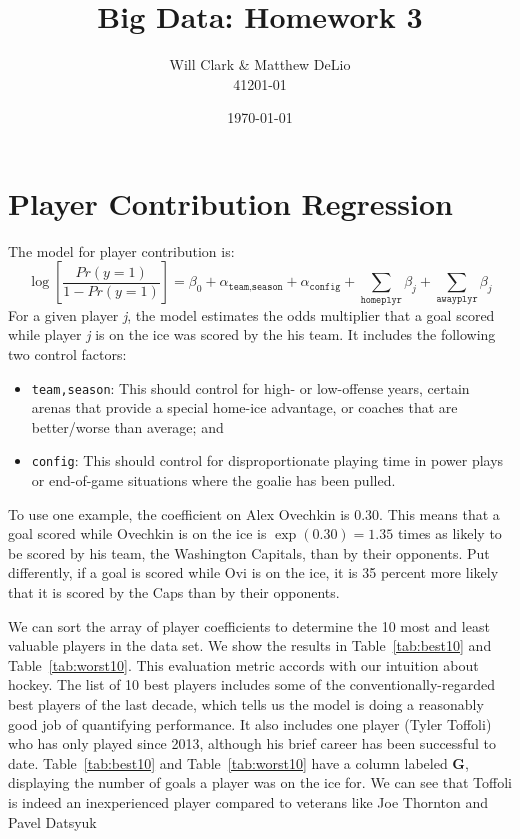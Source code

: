 \documentclass[11pt, fleqn]{article}
\begin{document}
\title{Big Data: Homework 3}
\author{Will Clark \& Matthew DeLio \\ 41201-01}
\date{\today}
\maketitle

\section{Player Contribution Regression}

The model for player contribution is:
\[ \log\left[\frac{Pr(y=1)}{1-Pr(y=1)}\right] = \beta_0 + \alpha_{\texttt{team,season}} + \alpha_{\texttt{config}} + \sum_{\texttt{homeplyr}} \beta_j + \sum_{\texttt{awayplyr}} \beta_j \]
For a given player \textit{j}, the model estimates the odds multiplier that a goal scored while player \textit{j} is on the ice was scored by the his team. It includes the following two control factors:
\begin{itemize}
  \item \texttt{team,season}: This should control for high- or low-offense years, certain arenas that provide a special home-ice advantage, or coaches that are better/worse than average; and
  \item \texttt{config}: This should control for disproportionate playing time in power plays or end-of-game situations where the goalie has been pulled.
\end{itemize}
To use one example, the coefficient on Alex Ovechkin is 0.30. This means that a goal scored while Ovechkin is on the ice is $\exp(0.30)=1.35$ times as likely to be scored by his team, the Washington Capitals, than by their opponents. Put differently, if a goal is scored while Ovi is on the ice, it is 35 percent more likely that it is scored by the Caps than by their opponents.

We can sort the array of player coefficients to determine the 10 most and least valuable players in the data set. We show the results in Table~\ref{tab:best10} and Table~\ref{tab:worst10}. This evaluation metric accords with our intuition about hockey. The list of 10 best players includes some of the conventionally-regarded best players of the last decade, which tells us the model is doing a reasonably good job of quantifying performance. It also includes one player (Tyler Toffoli) who has only played since 2013, although his brief career has been successful to date. Table~\ref{tab:best10} and Table~\ref{tab:worst10} have a column labeled \textbf{G}, displaying the number of goals a player was on the ice for. We can see that Toffoli is indeed an inexperienced player compared to veterans like Joe Thornton and Pavel Datsyuk
\end{document}
